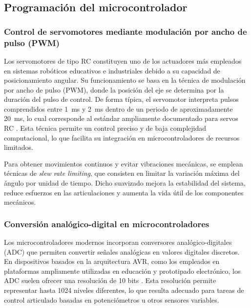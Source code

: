 \subsection{Programación del microcontrolador}


\subsubsection{Control de servomotores mediante modulación por ancho de pulso (PWM)}

Los servomotores de tipo RC constituyen uno de los actuadores más empleados en sistemas robóticos educativos e industriales debido a su capacidad de posicionamiento angular. Su funcionamiento se basa en la técnica de modulación por ancho de pulso (PWM), donde la posición del eje se determina por la duración del pulso de control. De forma típica, el servomotor interpreta pulsos comprendidos entre 1~ms y 2~ms dentro de un periodo de aproximadamente 20~ms, lo cual corresponde al estándar ampliamente documentado para servos RC \cite{servocity_servofaq, mg996r_datasheet, TowerProSG90}. Esta técnica permite un control preciso y de baja complejidad computacional, lo que facilita su integración en microcontroladores de recursos limitados.

\vspace{1em}

Para obtener movimientos continuos y evitar vibraciones mecánicas, se emplean técnicas de \emph{slew rate limiting}, que consisten en limitar la variación máxima del ángulo por unidad de tiempo. Dicho suavizado mejora la estabilidad del sistema, reduce esfuerzos en las articulaciones y aumenta la vida útil de los componentes mecánicos.

\subsubsection{Conversión analógico-digital en microcontroladores}

Los microcontroladores modernos incorporan conversores analógico-digitales (ADC) que permiten convertir señales analógicas en valores digitales discretos. En dispositivos basados en la arquitectura AVR, como los empleados en plataformas ampliamente utilizadas en educación y prototipado electrónico, los ADC suelen ofrecer una resolución de 10 bits \cite{arduino_uno_rev3_docs}. Esta resolución permite representar hasta 1024 niveles diferentes, lo que resulta adecuado para tareas de control articulado basadas en potenciómetros u otros sensores variables.

